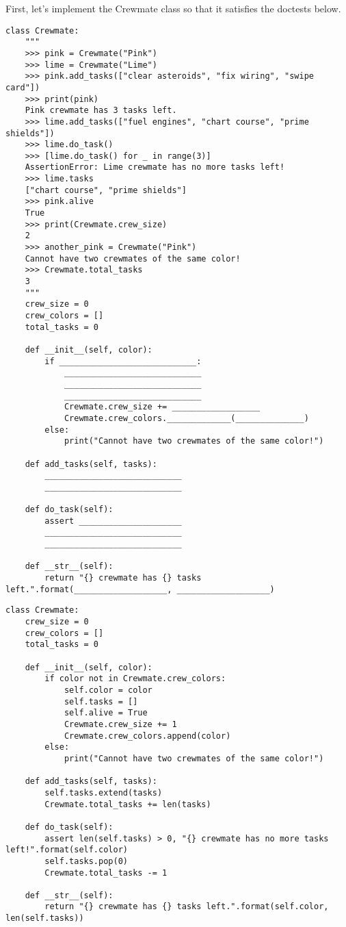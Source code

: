 \question First, let's implement the Crewmate class so that it satisfies the doctests below.
\begin{lstlisting}
class Crewmate:
    """
    >>> pink = Crewmate("Pink")
    >>> lime = Crewmate("Lime")
    >>> pink.add_tasks(["clear asteroids", "fix wiring", "swipe card"])
    >>> print(pink)
    Pink crewmate has 3 tasks left.
    >>> lime.add_tasks(["fuel engines", "chart course", "prime shields"])
    >>> lime.do_task()
    >>> [lime.do_task() for _ in range(3)]
    AssertionError: Lime crewmate has no more tasks left!
    >>> lime.tasks
    ["chart course", "prime shields"]
    >>> pink.alive
    True
    >>> print(Crewmate.crew_size)
    2
    >>> another_pink = Crewmate("Pink")
    Cannot have two crewmates of the same color!
    >>> Crewmate.total_tasks
    3
    """
    crew_size = 0
    crew_colors = []
    total_tasks = 0
    
    def __init__(self, color):
        if ____________________________:
            ____________________________
            ____________________________
            ____________________________
            Crewmate.crew_size += __________________
            Crewmate.crew_colors._____________(______________)
        else:
            print("Cannot have two crewmates of the same color!")
            
    def add_tasks(self, tasks):
        ____________________________
        ____________________________
    
    def do_task(self):
        assert _____________________
        ____________________________
        ____________________________
    
    def __str__(self):
        return "{} crewmate has {} tasks left.".format(___________________, ___________________)
\end{lstlisting}
\begin{solution}
\begin{lstlisting}
class Crewmate:
    crew_size = 0
    crew_colors = []
    total_tasks = 0
    
    def __init__(self, color):
        if color not in Crewmate.crew_colors:
            self.color = color
            self.tasks = []
            self.alive = True
            Crewmate.crew_size += 1
            Crewmate.crew_colors.append(color)
        else:
            print("Cannot have two crewmates of the same color!")
            
    def add_tasks(self, tasks):
        self.tasks.extend(tasks)
        Crewmate.total_tasks += len(tasks)
    
    def do_task(self):
        assert len(self.tasks) > 0, "{} crewmate has no more tasks left!".format(self.color)
        self.tasks.pop(0)
        Crewmate.total_tasks -= 1
    
    def __str__(self):
        return "{} crewmate has {} tasks left.".format(self.color, len(self.tasks))
\end{lstlisting}
\end{solution}

